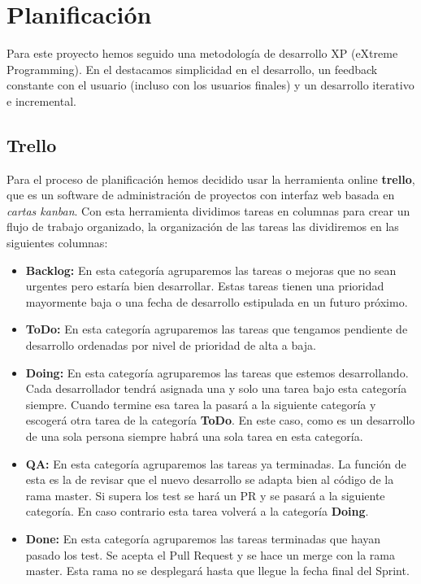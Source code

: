 \setcounter{chapter}{4}
\setcounter{section}{0}
\setcounter{subsection}{0}
\chapter{Planificación}

Para este proyecto hemos seguido una metodología de desarrollo XP (eXtreme Programming). En el destacamos simplicidad en el desarrollo, un feedback constante con el usuario (incluso con los usuarios finales) y un desarrollo iterativo e incremental.\\

\section{Trello}

Para el proceso de planificación hemos decidido usar la herramienta online \textbf{trello}, que es un software de administración de proyectos con interfaz web basada en \textit{cartas kanban}. Con esta herramienta dividimos tareas en columnas para crear un flujo de trabajo organizado, la organización de las tareas las dividiremos en las siguientes columnas:

\begin{itemize}
	\item \textbf{Backlog:} En esta categoría agruparemos las tareas o mejoras que no sean urgentes pero estaría bien desarrollar. Estas tareas tienen una prioridad mayormente baja o una fecha de desarrollo estipulada en un futuro próximo.
	\item \textbf{ToDo:} En esta categoría agruparemos las tareas que tengamos pendiente de desarrollo ordenadas por nivel de prioridad de alta a baja.
	\item \textbf{Doing:} En esta categoría agruparemos las tareas que estemos desarrollando. Cada desarrollador tendrá asignada una y solo una tarea bajo esta categoría siempre. Cuando termine esa tarea la pasará a la siguiente categoría y escogerá otra tarea de la categoría \textbf{ToDo}. En este caso, como es un desarrollo de una sola persona siempre habrá una sola tarea en esta categoría.
	\item \textbf{QA:} En esta categoría agruparemos las tareas ya terminadas. La función de esta es la de revisar que el nuevo desarrollo se adapta bien al código de la rama master. Si supera los test se hará un PR y se pasará a la siguiente categoría. En caso contrario esta tarea volverá a la categoría \textbf{Doing}.
	\item \textbf{Done: } En esta categoría agruparemos las tareas terminadas que hayan pasado los test. Se acepta el Pull Request y se hace un merge con la rama master. Esta rama no se desplegará hasta que llegue la fecha final del Sprint.
\end{itemize}

